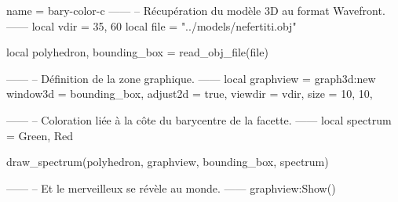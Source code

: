 \documentclass{standalone}
\begin{document}
\begin{luadraw}{name = bary-color-c}
------
-- Récupération du modèle 3D au format Wavefront.
------
local vdir = {35, 60}
local file = "../models/nefertiti.obj"

local polyhedron, bounding_box = read_obj_file(file)

------
-- Définition de la zone graphique.
------
local graphview = graph3d:new{
  window3d = bounding_box,
  adjust2d = true,
  viewdir  = vdir,
  size     = {10, 10},
}

------
-- Coloration liée à la côte du barycentre de la facette.
------
local spectrum = {Green, Red}

draw_spectrum(polyhedron, graphview, bounding_box, spectrum)

------
-- Et le merveilleux se révèle au monde.
------
graphview:Show()
\end{luadraw}
\end{document}

